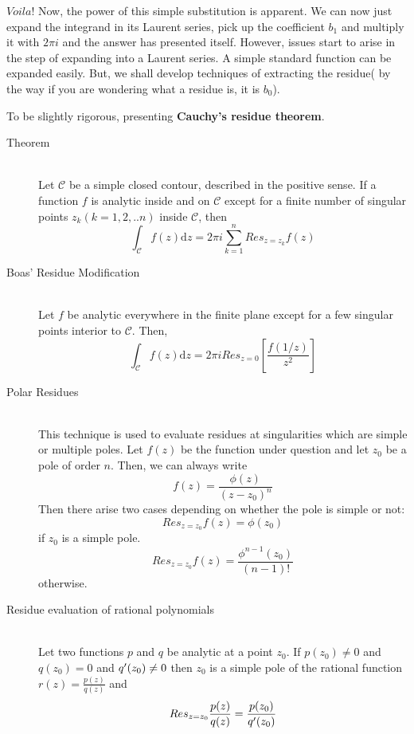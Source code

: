 \documentclass[11pt]{article}
\begin{document}
\begin{sloppypar}
$Voila!$ Now, the power of this simple substitution is apparent. We can now just expand the integrand in its Laurent series, pick up the coefficient $b_{1}$ and multiply it with $2\pi i$ and the answer has presented itself. However, issues start to arise in the step of expanding into a Laurent series. A simple standard function can be expanded easily. But, we shall develop techniques of extracting the residue( by the way if you are wondering what a residue is, it is $b_{0}$).

To be slightly rigorous, presenting \textbf{Cauchy\rq{}s residue theorem}.
\begin{description}
\item[Theorem] \hfill \\
	Let $\mathcal{C}$ be a simple closed contour, described in the positive sense. If a function $f$ is analytic inside and on $\mathcal{C}$ except for a finite number of singular points $z_{k}(k=1,2,..n)$ inside $\mathcal{C}$, then
$$\int_{\mathcal{C}}f(z)\mathrm{d}z = 2\pi i\sum_{k=1}^{n}Res_{z=z_{k}}f(z)$$

\item[Boas\rq{} Residue Modification] \hfill \\
	Let $f$ be analytic everywhere in the finite plane except for a few singular points interior to $\mathcal{C}$. Then,
$$\int_{\mathcal{C}}f(z)\mathrm{d}z = 2\pi i Res_{z=0}[\frac{f(1/z)}{z^2}]$$

\item[Polar Residues] \hfill \\
	This technique is used to evaluate residues at singularities which are simple or multiple poles. Let $f(z)$ be the function under question and let $z_{0}$ be a pole of order $n$. Then, we can always write $$f(z) = \frac{\phi(z)}{(z-z_{0})^n}$$ Then there arise two cases depending on whether the pole is simple or not:
	$$Res_{z=z_{0}}f(z) = \phi(z_{0})$$ if $z_{0}$ is a simple pole.
	$$Res_{z=z_{0}}f(z) = \frac{\phi^{n-1}(z_{0})}{(n-1)!}$$ otherwise.

\item[Residue evaluation of rational polynomials] \hfill \\
	Let two functions $p$ and $q$ be analytic at a point $z_{0}$. If $p(z_{0}) \neq 0$ and $q(z_{0}) = 0$ and $q\rq{}(z_{0}) \neq 0$ then $z_{0}$ is a simple pole of the rational function $r(z) = \frac{p(z)}{q(z)}$ and 
$$Res_{z=z_{0}}\frac{p(z)}{q(z)} = \frac{p(z_{0})}{q\rq{}(z_{0})}$$

\end{description}


\end{sloppypar}
\end{document}

